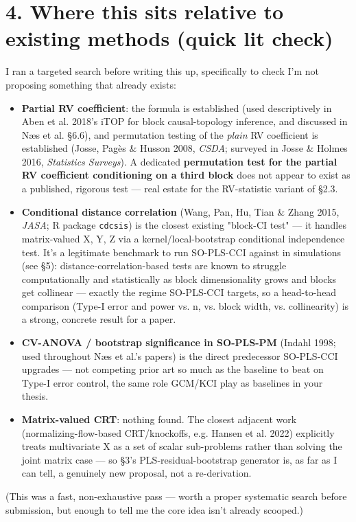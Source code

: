 \documentclass[11pt,a4paper]{article}
\begin{document}
	
	\section{4. Where this sits relative to existing methods (quick lit check)}
	
	I ran a targeted search before writing this up, specifically to check I'm not proposing something that already exists:
	
	\begin{itemize}
		\item \textbf{Partial RV coefficient}: the formula is established (used descriptively in Aben et al. 2018's iTOP for block causal-topology inference, and discussed in Næs et al. \S{}6.6), and permutation testing of the \emph{plain} RV coefficient is established (Josse, Pagès \& Husson 2008, \emph{CSDA}; surveyed in Josse \& Holmes 2016, \emph{Statistics Surveys}). A dedicated \textbf{permutation test for the partial RV coefficient conditioning on a third block} does not appear to exist as a published, rigorous test — real estate for the RV-statistic variant of \S{}2.3.
		\item \textbf{Conditional distance correlation} (Wang, Pan, Hu, Tian \& Zhang 2015, \emph{JASA}; R package \texttt{cdcsis}) is the closest existing "block-CI test" — it handles matrix-valued X, Y, Z via a kernel/local-bootstrap conditional independence test. It's a legitimate benchmark to run SO-PLS-CCI against in simulations (see \S{}5): distance-correlation-based tests are known to struggle computationally and statistically as block dimensionality grows and blocks get collinear — exactly the regime SO-PLS-CCI targets, so a head-to-head comparison (Type-I error and power vs. n, vs. block width, vs. collinearity) is a strong, concrete result for a paper.
		\item \textbf{CV-ANOVA / bootstrap significance in SO-PLS-PM} (Indahl 1998; used throughout Næs et al.'s papers) is the direct predecessor SO-PLS-CCI upgrades — not competing prior art so much as the baseline to beat on Type-I error control, the same role GCM/KCI play as baselines in your thesis.
		\item \textbf{Matrix-valued CRT}: nothing found. The closest adjacent work (normalizing-flow-based CRT/knockoffs, e.g. Hansen et al. 2022) explicitly treats multivariate X as a set of scalar sub-problems rather than solving the joint matrix case — so \S{}3's PLS-residual-bootstrap generator is, as far as I can tell, a genuinely new proposal, not a re-derivation.
		
	\end{itemize}
	(This was a fast, non-exhaustive pass — worth a proper systematic search before submission, but enough to tell me the core idea isn't already scooped.)
	
\end{document}
